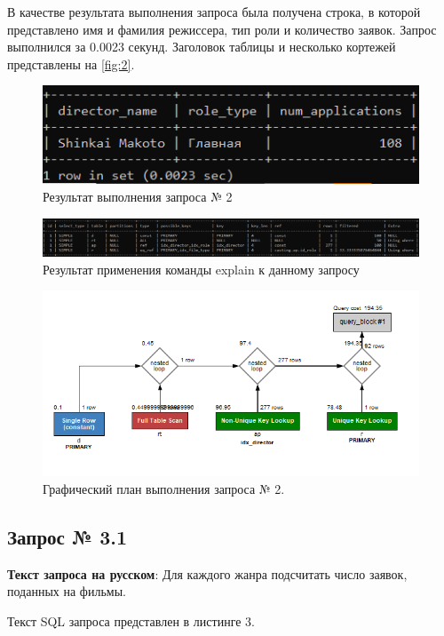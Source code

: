 \documentclass[11pt,a4paper,final]{article} %
\begin{document}
В качестве результата выполнения запроса была получена строка, в которой представлено имя и фамилия режиссера, тип роли и количество заявок. Запрос выполнился за 0.0023 секунд. Заголовок таблицы и несколько кортежей представлены на \autoref{fig:2}.

\begin{figure}[H]
	\centering
	\includegraphics[width=0.7\linewidth]{2.png}
	\caption{Результат выполнения запроса № 2}
	\label{fig:2}
\end{figure}


\begin{figure}[H]
	\centering
	\includegraphics[width=1.0\linewidth]{e2.png}
	\caption{Результат применения команды explain к данному запросу}
	\label{fig:e2}
\end{figure}

\begin{figure}[H]
	\centering
	\includegraphics[width=1.0\linewidth]{ex2.png}
	\caption{Графический план выполнения запроса № 2.}
	\label{fig:ex2}
\end{figure}


\subsection{Запрос № 3.1}

\par \textbf{Текст запроса на русском}: Для каждого жанра подсчитать число заявок, поданных на фильмы. 
\par Текст SQL запроса представлен в листинге 3.
\end{document}
